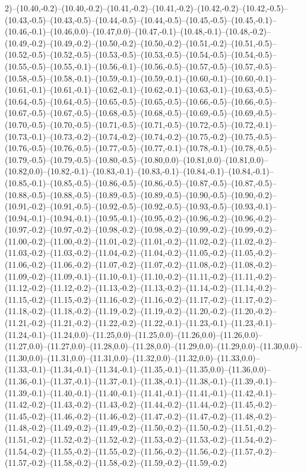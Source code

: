 2)--(10.40,-0.2)--(10.40,-0.2)--(10.41,-0.2)--(10.41,-0.2)--(10.42,-0.2)--(10.42,-0.5)--(10.43,-0.5)--(10.43,-0.5)--(10.44,-0.5)--(10.44,-0.5)--(10.45,-0.5)--(10.45,-0.1)--(10.46,-0.1)--(10.46,0.0)--(10.47,0.0)--(10.47,-0.1)--(10.48,-0.1)--(10.48,-0.2)--(10.49,-0.2)--(10.49,-0.2)--(10.50,-0.2)--(10.50,-0.2)--(10.51,-0.2)--(10.51,-0.5)--(10.52,-0.5)--(10.52,-0.5)--(10.53,-0.5)--(10.53,-0.5)--(10.54,-0.5)--(10.54,-0.5)--(10.55,-0.5)--(10.55,-0.1)--(10.56,-0.1)--(10.56,-0.5)--(10.57,-0.5)--(10.57,-0.5)--(10.58,-0.5)--(10.58,-0.1)--(10.59,-0.1)--(10.59,-0.1)--(10.60,-0.1)--(10.60,-0.1)--(10.61,-0.1)--(10.61,-0.1)--(10.62,-0.1)--(10.62,-0.1)--(10.63,-0.1)--(10.63,-0.5)--(10.64,-0.5)--(10.64,-0.5)--(10.65,-0.5)--(10.65,-0.5)--(10.66,-0.5)--(10.66,-0.5)--(10.67,-0.5)--(10.67,-0.5)--(10.68,-0.5)--(10.68,-0.5)--(10.69,-0.5)--(10.69,-0.5)--(10.70,-0.5)--(10.70,-0.5)--(10.71,-0.5)--(10.71,-0.5)--(10.72,-0.5)--(10.72,-0.1)--(10.73,-0.1)--(10.73,-0.2)--(10.74,-0.2)--(10.74,-0.2)--(10.75,-0.2)--(10.75,-0.5)--(10.76,-0.5)--(10.76,-0.5)--(10.77,-0.5)--(10.77,-0.1)--(10.78,-0.1)--(10.78,-0.5)--(10.79,-0.5)--(10.79,-0.5)--(10.80,-0.5)--(10.80,0.0)--(10.81,0.0)--(10.81,0.0)--(10.82,0.0)--(10.82,-0.1)--(10.83,-0.1)--(10.83,-0.1)--(10.84,-0.1)--(10.84,-0.1)--(10.85,-0.1)--(10.85,-0.5)--(10.86,-0.5)--(10.86,-0.5)--(10.87,-0.5)--(10.87,-0.5)--(10.88,-0.5)--(10.88,-0.5)--(10.89,-0.5)--(10.89,-0.5)--(10.90,-0.5)--(10.90,-0.2)--(10.91,-0.2)--(10.91,-0.5)--(10.92,-0.5)--(10.92,-0.5)--(10.93,-0.5)--(10.93,-0.1)--(10.94,-0.1)--(10.94,-0.1)--(10.95,-0.1)--(10.95,-0.2)--(10.96,-0.2)--(10.96,-0.2)--(10.97,-0.2)--(10.97,-0.2)--(10.98,-0.2)--(10.98,-0.2)--(10.99,-0.2)--(10.99,-0.2)--(11.00,-0.2)--(11.00,-0.2)--(11.01,-0.2)--(11.01,-0.2)--(11.02,-0.2)--(11.02,-0.2)--(11.03,-0.2)--(11.03,-0.2)--(11.04,-0.2)--(11.04,-0.2)--(11.05,-0.2)--(11.05,-0.2)--(11.06,-0.2)--(11.06,-0.2)--(11.07,-0.2)--(11.07,-0.2)--(11.08,-0.2)--(11.08,-0.2)--(11.09,-0.2)--(11.09,-0.1)--(11.10,-0.1)--(11.10,-0.2)--(11.11,-0.2)--(11.11,-0.2)--(11.12,-0.2)--(11.12,-0.2)--(11.13,-0.2)--(11.13,-0.2)--(11.14,-0.2)--(11.14,-0.2)--(11.15,-0.2)--(11.15,-0.2)--(11.16,-0.2)--(11.16,-0.2)--(11.17,-0.2)--(11.17,-0.2)--(11.18,-0.2)--(11.18,-0.2)--(11.19,-0.2)--(11.19,-0.2)--(11.20,-0.2)--(11.20,-0.2)--(11.21,-0.2)--(11.21,-0.2)--(11.22,-0.2)--(11.22,-0.1)--(11.23,-0.1)--(11.23,-0.1)--(11.24,-0.1)--(11.24,0.0)--(11.25,0.0)--(11.25,0.0)--(11.26,0.0)--(11.26,0.0)--(11.27,0.0)--(11.27,0.0)--(11.28,0.0)--(11.28,0.0)--(11.29,0.0)--(11.29,0.0)--(11.30,0.0)--(11.30,0.0)--(11.31,0.0)--(11.31,0.0)--(11.32,0.0)--(11.32,0.0)--(11.33,0.0)--(11.33,-0.1)--(11.34,-0.1)--(11.34,-0.1)--(11.35,-0.1)--(11.35,0.0)--(11.36,0.0)--(11.36,-0.1)--(11.37,-0.1)--(11.37,-0.1)--(11.38,-0.1)--(11.38,-0.1)--(11.39,-0.1)--(11.39,-0.1)--(11.40,-0.1)--(11.40,-0.1)--(11.41,-0.1)--(11.41,-0.1)--(11.42,-0.1)--(11.42,-0.2)--(11.43,-0.2)--(11.43,-0.2)--(11.44,-0.2)--(11.44,-0.2)--(11.45,-0.2)--(11.45,-0.2)--(11.46,-0.2)--(11.46,-0.2)--(11.47,-0.2)--(11.47,-0.2)--(11.48,-0.2)--(11.48,-0.2)--(11.49,-0.2)--(11.49,-0.2)--(11.50,-0.2)--(11.50,-0.2)--(11.51,-0.2)--(11.51,-0.2)--(11.52,-0.2)--(11.52,-0.2)--(11.53,-0.2)--(11.53,-0.2)--(11.54,-0.2)--(11.54,-0.2)--(11.55,-0.2)--(11.55,-0.2)--(11.56,-0.2)--(11.56,-0.2)--(11.57,-0.2)--(11.57,-0.2)--(11.58,-0.2)--(11.58,-0.2)--(11.59,-0.2)--(11.59,-0.2)
